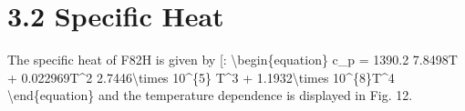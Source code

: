 \documentclass[letterpaper,10pt,english]{jupyterBook}
\begin{document}
	
	\section{3.2 Specific Heat}
	\label{\detokenize{3 Thermophysical Properties:specific-heat}}
	\sphinxAtStartPar
	The specific heat of F82H is given by {[}\sphinxhref{https://drive.google.com/file/d/1EAKnctMi6BqWtE4DrxCDe5L8niCH0WDe/view?usp=drive\_link}{TavassoliRensman2002}{]}:
	\textbackslash{}begin\{equation\}
	c\_p = 1390.2 \sphinxhyphen{}7.8498T + 0.022969T\textasciicircum{}2 \sphinxhyphen{} 2.7446\textbackslash{}times 10\textasciicircum{}\{\sphinxhyphen{}5\} T\textasciicircum{}3 + 1.1932\textbackslash{}times 10\textasciicircum{}\{\sphinxhyphen{}8\}T\textasciicircum{}4
	\textbackslash{}end\{equation\}
	and the temperature dependence is displayed in Fig. 12.
	
\end{document}
